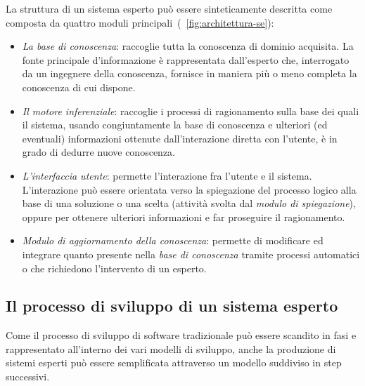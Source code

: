 La struttura di un sistema esperto può essere sinteticamente descritta come composta da quattro moduli principali~(\figurename~\ref{fig:architettura-se}):
\begin{itemize}
	\item \emph{La base di conoscenza}: raccoglie tutta la conoscenza di dominio acquisita. La fonte principale d'informazione è rappresentata dall'esperto che, interrogato da un ingegnere della conoscenza, fornisce in maniera più o meno completa la conoscenza di cui dispone.
	\item \emph{Il motore inferenziale}: raccoglie i processi di ragionamento sulla base dei quali il sistema, usando congiuntamente la base di conoscenza e ulteriori (ed eventuali) informazioni ottenute dall'interazione diretta con l'utente, è in grado di dedurre nuove conoscenza.
	\item \emph{L'interfaccia utente}: permette l'interazione fra l'utente e il sistema. L'interazione può essere orientata verso la spiegazione del processo logico alla base di una soluzione o una scelta (attività svolta dal \emph{modulo di spiegazione}), oppure per ottenere ulteriori informazioni e far proseguire il ragionamento.
	\item \emph{Modulo di aggiornamento della conoscenza}: permette di modificare ed integrare quanto presente nella \emph{base di conoscenza} tramite processi automatici o che richiedono l'intervento di un esperto.
\end{itemize}

\subsection{Il processo di sviluppo di un sistema esperto}
Come il processo di sviluppo di software tradizionale può essere scandito in fasi e rappresentato all'interno dei vari modelli di sviluppo, anche la produzione di sistemi esperti può essere semplificata attraverso un modello suddiviso in step successivi. 

